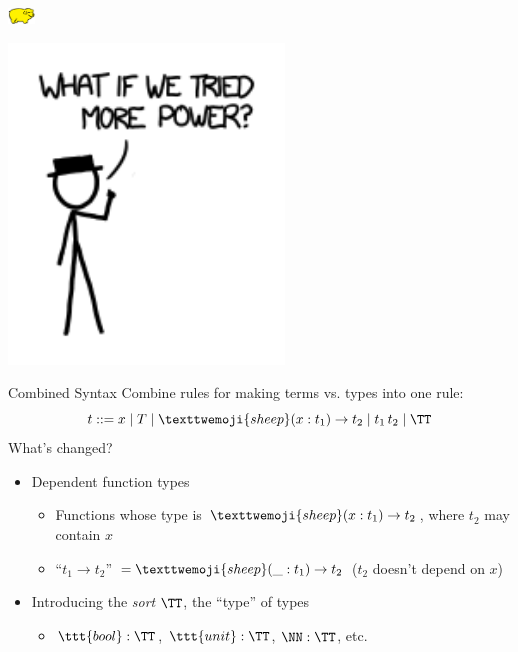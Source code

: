 \documentclass{beamer}
\newcommand{\lamb}{\texttwemoji{sheep}}
\begin{document}
\begin{frame}{\includegraphics[width=20pt]{yellowPig.png}}
 \begin{center}
   \includegraphics[width=0.55\textwidth]{more_power.png} 
 \end{center} 
\end{frame}

\begin{frame}{Combined Syntax}
  Combine rules for making terms vs. types into one rule: 
  \[
  t ::= x \mid T \mid \lamb (x :t_1) \to t_2 \mid t_1 \, t_2 \mid \TT
  \] 
  What's changed? \pause 
  \begin{itemize}
    \item Dependent function types
      \begin{itemize}
        \item Functions whose type is $\lamb (x : t_1) \to t_2$, where $t_2$
          may contain $x$
        \item ``$t_1 \to t_2$'' $= \lamb (\_ : t_1) \to t_2$ ($t_2$ doesn't
          depend on $x$)
      \end{itemize}
      \pause
    \item Introducing the \emph{sort} $\TT$, the ``type'' of types
      \begin{itemize}
        \item $\ttt{bool} : \TT$, $\ttt{unit} : \TT$, $\NN : \TT$, etc. 
      \end{itemize}
  \end{itemize}
\end{frame}
\end{document}
